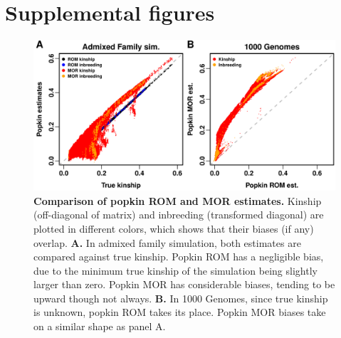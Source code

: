 \documentclass[11pt]{article}
\newcommand{\beginsupplement}{%
  \setcounter{table}{0}
  \renewcommand{\thetable}{S\arabic{table}}%
  \setcounter{figure}{0}
  \renewcommand{\thefigure}{S\arabic{figure}}%
  \setcounter{section}{0}
  \renewcommand{\thesection}{S\arabic{section}}%
  \setcounter{equation}{0}
  \renewcommand{\theequation}{S\arabic{equation}}%
  \setcounter{page}{1}
  \renewcommand{\thepage}{S\arabic{page}}%
}
\begin{document}

\clearpage

\beginsupplement

\section*{Supplemental figures}

\begin{figure}[hp!]
  \centering
  \includegraphics[width=\textwidth]{popkin-mor-rom-bias.png}
  \caption{
    {\bf Comparison of popkin ROM and MOR estimates.}
    Kinship (off-diagonal of matrix) and inbreeding (transformed diagonal) are plotted in different colors, which shows that their biases (if any) overlap.
    \textbf{A.}
    In admixed family simulation, both estimates are compared against true kinship.
    Popkin ROM has a negligible bias, due to the minimum true kinship of the simulation being slightly larger than zero.
    Popkin MOR has considerable biases, tending to be upward though not always.
    \textbf{B.}
    In 1000 Genomes, since true kinship is unknown, popkin ROM takes its place.
    Popkin MOR biases take on a similar shape as panel A.
    }
  \label{fig:popkin-rom-mor}
\end{figure}
\end{document}

